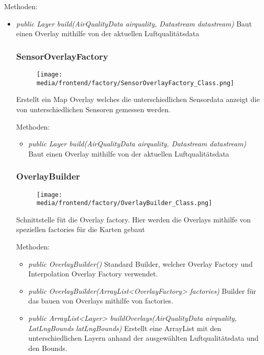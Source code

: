 Methoden:
\begin{itemize} 
    \item \emph{public Layer build(AirQualityData airquality,  Datastream datastream)} Baut einen Overlay mithilfe von der aktuellen Luftqualitätsdata

\subsubsection{SensorOverlayFactory}
\begin{minipage}{0.3\textwidth}
    \begin{figure}[H]
        \texttt{[image: media/frontend/factory/SensorOverlayFactory\_Class.png]}
    \end{figure}
    \end{minipage} \hfill
    \begin{minipage}{0.6\textwidth}
        Erstellt ein Map Overlay welches die unterschiedlichen Sensordata anzeigt die von unterschiedlichen Sensoren gemessen werden.
\end{minipage}

Methoden:
\begin{itemize} 
    \item \emph{public Layer build(AirQualityData airquality,  Datastream datastream)} Baut einen Overlay mithilfe von der aktuellen Luftqualitätsdata
\end{itemize}

\subsubsection{OverlayBuilder}
\begin{minipage}{0.3\textwidth}
    \begin{figure}[H]
        \texttt{[image: media/frontend/factory/OverlayBuilder\_Class.png]}
    \end{figure}
    \end{minipage} \hfill
    \begin{minipage}{0.6\textwidth}
Schnittstelle füt die Overlay factory. Hier werden die Overlays mithilfe von speziellen factories für die Karten gebaut
\end{minipage}

Methoden:
\begin{itemize} 
    \item \emph{public OverlayBuilder()} Standard Builder, welcher Overlay Factory und Interpolation Overlay Factory verwendet.
    \item \emph{public OverlayBuilder(ArrayList<OverlayFactory> factories)} Builder für das bauen von Overlays mithilfe von factories.
    \item \emph{public ArrayList<Layer> buildOverlays(AirQualityData airquality, LatLngBounds latLngBounds)} Erstellt eine ArrayList mit den unterschiedlichen Layern anhand der ausgewählten Luftqualitätsdata und den Bounds.
\end{itemize}



\end{itemize}
